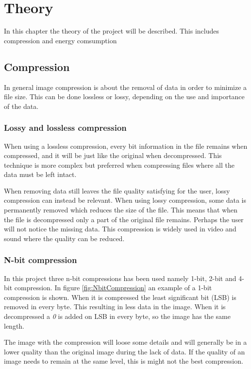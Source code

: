 \chapter{Theory}
\label{chp:theory}

In this chapter the theory of the project will be described. This includes compression and energy comsumption

\section{Compression}
In general image compression is about the removal of data in order to minimize a file size. This can be done lossless or lossy, depending on the use and importance of the data.

\subsection{Lossy and lossless compression}
When using a lossless compression, every bit information in the file remains when compressed, and it will be just like the original when decompressed. This technique is more complex but preferred when compressing files where all the data must be left intact.

When removing data still leaves the file quality satisfying for the user, lossy compression can instead be relevant. When using lossy compression, some data is permanently removed which reduces the size of the file. This means that when the file is decompressed only a part of the original file remains. Perhaps the user will not notice the missing data. This compression is widely used in video and sound where the quality can be reduced.  

\subsection{N-bit compression}
In this project three n-bit compressions has been used namely 1-bit, 2-bit and 4-bit compression. In figure \ref{fig:NbitCompression} an example of a 1-bit compression is shown. When it is compressed the least significant bit (LSB) is removed in every byte. This resulting in less data in the image. When it is decompressed a \emph{0} is added on LSB in every byte, so the image has the same length. 


The image with the compression will loose some details and will generally be in a lower quality than the original image during the lack of data. If the quality of an image needs to remain at the same level, this is might not the best compression.  

